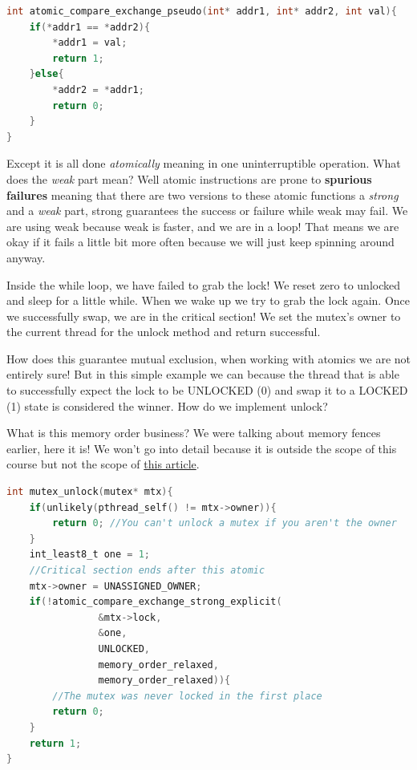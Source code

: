 \begin{lstlisting}[language=C]
int atomic_compare_exchange_pseudo(int* addr1, int* addr2, int val){
    if(*addr1 == *addr2){
        *addr1 = val;
        return 1;
    }else{
        *addr2 = *addr1;
        return 0;
    }
}
\end{lstlisting}

Except it is all done \emph{atomically} meaning in one uninterruptible operation. What does the \emph{weak} part mean? Well atomic instructions are prone to \textbf{spurious failures} meaning that there are two versions to these atomic functions a \emph{strong} and a \emph{weak} part, strong guarantees the success or failure while weak may fail. We are using weak because weak is faster, and we are in a loop! That means we are okay if it fails a little bit more often because we will just keep spinning around anyway.

Inside the while loop, we have failed to grab the lock! We reset zero to unlocked and sleep for a little while. When we wake up we try to grab the lock again. Once we successfully swap, we are in the critical section! We set the mutex's owner to the current thread for the unlock method and return successful.

How does this guarantee mutual exclusion, when working with atomics we are not entirely sure! But in this simple example we can because the thread that is able to successfully expect the lock to be UNLOCKED (0) and swap it to a LOCKED (1) state is considered the winner. How do we implement unlock?

What is this memory order business? We were talking about memory fences earlier, here it is! We won't go into detail because it is outside the scope of this course but not the scope of \href{https://gcc.gnu.org/wiki/Atomic/GCCMM/AtomicSync}{this article}.

\begin{lstlisting}[language=C]
int mutex_unlock(mutex* mtx){
    if(unlikely(pthread_self() != mtx->owner)){
        return 0; //You can't unlock a mutex if you aren't the owner
    }
    int_least8_t one = 1;
    //Critical section ends after this atomic
    mtx->owner = UNASSIGNED_OWNER;
    if(!atomic_compare_exchange_strong_explicit(
                &mtx->lock, 
                &one, 
                UNLOCKED,
                memory_order_relaxed,
                memory_order_relaxed)){
        //The mutex was never locked in the first place
        return 0;
    }
    return 1;
}
\end{lstlisting}

